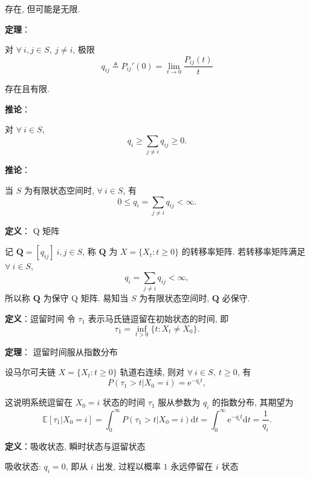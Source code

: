 \documentclass[openany]{ctexbook}
\theoremstyle{kaiti}
\theoremstyle{normal}
\begin{document}
存在, 但可能是无限.

\textbf{定理}：

对 $\forall~i,j\in S,~j\neq i$, 极限
\begin{equation}
  q_{ij}\triangleq P_{ij}'(0)=\lim_{t\to0}\frac{P_{ij}(t)}{t}
\end{equation}

存在且有限.

\textbf{推论}：

对 $\forall~i\in S$,
\begin{equation}
  q_i\geqslant\sum_{j\neq i}q_{ij}\geqslant0.
\end{equation}

\textbf{推论}：

当 $S$ 为有限状态空间时, $\forall~i\in S$, 有
\begin{equation}
  0\leqslant q_i=\sum_{j\neq i}q_{ij}<\infty.
\end{equation}

\textbf{定义}： Q 矩阵

记 $\bm{Q}=[q_{ij}]~i,j\in S$, 称 $\bm{Q}$ 为 $X=\{X_t:t\geqslant0\}$ 的转移率矩阵. 
若转移率矩阵满足 $\forall~i\in S$, 
\begin{equation}
  q_i=\sum_{j\neq i}q_{ij}<\infty,
\end{equation}
所以称 $\bm{Q}$ 为保守 Q 矩阵. 易知当 $S$ 为有限状态空间时, $\bm{Q}$ 必保守.

\textbf{定义}：逗留时间
令 $\tau_1$ 表示马氏链逗留在初始状态的时间, 即
\begin{equation}
  \tau_1=\inf_{t>0}\{t:X_t\neq X_0\}.
\end{equation}

\textbf{定理}： 逗留时间服从指数分布

设马尔可夫链 $X=\{X_t:t\geqslant0\}$ 轨道右连续, 则对 $\forall~i\in S,~t\geqslant0$, 有
\begin{equation}
  P(\tau_1>t|X_0=i)=\mathrm{e}^{-q_it},
\end{equation}

这说明系统逗留在 $X_0=i$ 状态的时间 $\tau_1$ 服从参数为 $q_i$ 的指数分布, 其期望为
\begin{equation}
  \mathbb{E}[\tau_1|X_0=i]=\int_0^\infty P(\tau_1>t|X_0=i)\mathrm{d}t=\int_0^\infty\mathrm{e}^{-q_it}\mathrm{d}t=\frac{1}{q_i}.
\end{equation}

\textbf{定义}：吸收状态, 瞬时状态与逗留状态

吸收状态: $q_i=0$, 即从 $i$ 出发, 过程以概率 $1$ 永远停留在 $i$ 状态
\end{document}
